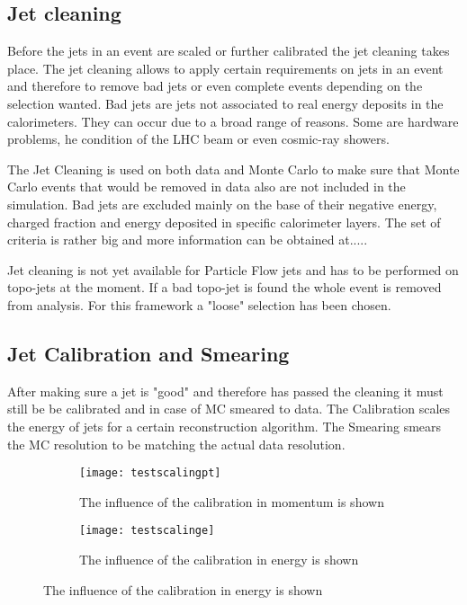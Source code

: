 \subsection{Jet cleaning}

Before the jets in an event are scaled or further calibrated the jet cleaning takes place. The jet cleaning allows to apply certain requirements on jets in an event and therefore to remove bad jets or even complete events depending on the selection wanted. Bad jets are jets not associated to real energy deposits in the calorimeters. They can occur due to a broad range of reasons. Some are hardware problems, he condition of the LHC beam or even cosmic-ray showers.

The Jet Cleaning is used on both data and Monte Carlo to make sure that Monte Carlo events that would be removed in data also are not included in the simulation.
Bad jets are excluded mainly on the base of their negative energy, charged fraction and energy deposited in specific calorimeter layers. The set of criteria is rather big and more information can be obtained at.....

Jet cleaning is not yet available for Particle Flow jets and has to be performed on topo-jets at the moment. If a bad topo-jet is found the whole event is removed from analysis.
For this framework a "loose" selection has been chosen.

\subsection{Jet Calibration and Smearing}

After making sure a jet is "good" and therefore has passed the cleaning it must still be be calibrated and in case of MC smeared to data. The Calibration scales the energy of jets for a certain reconstruction algorithm. The Smearing smears the MC resolution to be matching the actual data resolution.


\begin{figure}
\centering
\begin{subfigure}[b]{0.5\figwidth}
\texttt{[image: testscalingpt]}
\caption[Influence of the JES on the transversal momentum]{The influence of the calibration in momentum is shown}
\label{fig:testscalingpt}
\end{subfigure}
\quad
\begin{subfigure}[b]{0.5\figwidth}
\texttt{[image: testscalinge]}
\caption[Influence of the JES on the energy]{The influence of the calibration in energy is shown}
\label{fig:testscalinge}
\end{subfigure}
\end{figure}


